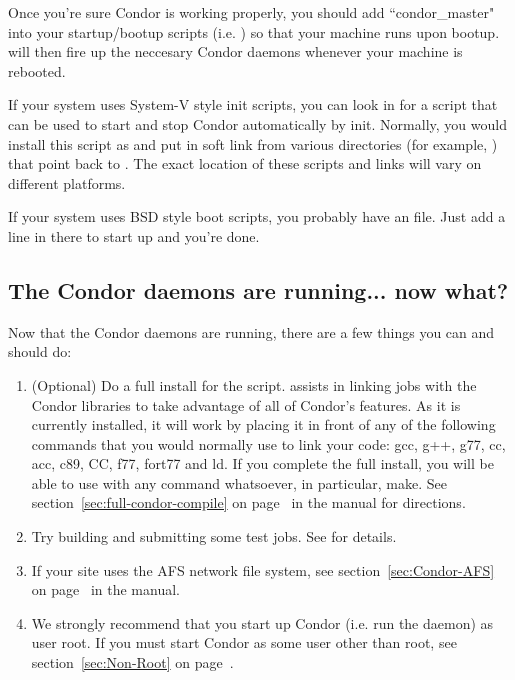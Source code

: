 Once you're sure Condor is working properly, you should add
``condor\_master" into your startup/bootup scripts (i.e.  ) so
that your machine runs  upon bootup.  
will then fire up the neccesary Condor daemons whenever your machine
is rebooted.  

If your system uses System-V style init scripts, you can look in
 for a script that can be used
to start and stop Condor automatically by init.  Normally, you would
install this script as  and put in soft link from
various directories (for example, ) that point back to
.  The exact location of these scripts and links
will vary on different platforms.

If your system uses BSD style boot scripts, you probably have an
 file.  Just add a line in there to start up
 and you're done.


\subsection{\label{sec:Running-Now-What}The Condor daemons are
running... now what?} 

Now that the Condor daemons are running, there are a few things you
can and should do:

\begin{enumerate}
\item (Optional) Do a full install for the  script.
     assists in linking jobs with the Condor libraries
    to take advantage of all of Condor's features.  As it is currently
    installed, it will work by placing it in front of any of the
    following commands that you would normally use to link your code:
    gcc, g++, g77, cc, acc, c89, CC, f77, fort77 and ld.  If you
    complete the full install, you will be able to use
     with any command whatsoever, in particular, make.
    See section~\ref{sec:full-condor-compile} on
    page~\pageref{sec:full-condor-compile} in the manual for
    directions.

\item Try building and submitting some test jobs.  See
     for details.

\item If your site uses the AFS network file system, see
section~\ref{sec:Condor-AFS} on page~\pageref{sec:Condor-AFS} in the
manual.

\item We strongly recommend that you start up Condor (i.e. run the
 daemon) as user root.  If you must start Condor as
some user other than root, see section~\ref{sec:Non-Root} on
page~\pageref{sec:Non-Root}.

\end{enumerate}

